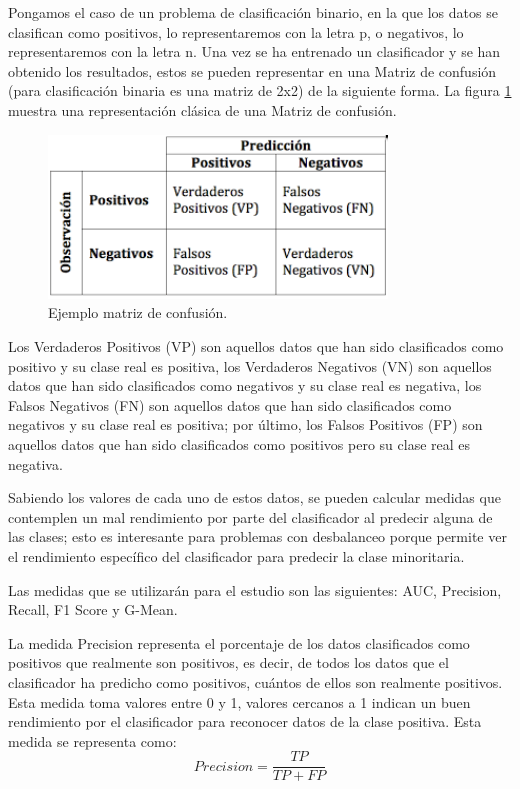 Pongamos el caso de un problema de clasificación binario, en la que los datos se clasifican como positivos, lo representaremos con la letra p, o negativos, lo representaremos con la letra n. Una vez se ha entrenado un clasificador y se han obtenido los resultados, estos se pueden representar en una Matriz de confusión (para clasificación binaria es una matriz de 2x2) de la siguiente forma. La figura \ref{fig:61} muestra una representación clásica de una Matriz de confusión.\newline

\begin{figure}[H]
	\centering
	\includegraphics[width=90mm]{imagenes/conf-matrix.png}
	\caption{Ejemplo matriz de confusión.}
	\label{fig:61}
\end{figure}

Los Verdaderos Positivos (VP) son aquellos datos que han sido clasificados como positivo y su clase real es positiva, los Verdaderos Negativos (VN) son aquellos datos que han sido clasificados como negativos y su clase real es negativa, los Falsos Negativos (FN) son aquellos datos que han sido clasificados como negativos y su clase real es positiva; por último, los Falsos Positivos (FP) son aquellos datos que han sido clasificados como positivos pero su clase real es negativa.\newline

Sabiendo los valores de cada uno de estos datos, se pueden calcular medidas que contemplen un mal rendimiento por parte del clasificador al predecir alguna de las clases; esto es interesante para problemas con desbalanceo porque permite ver el rendimiento específico del clasificador para predecir la clase minoritaria.\newline

Las medidas que se utilizarán para el estudio son las siguientes: AUC, Precision, Recall, F1 Score y G-Mean.\newline

La medida Precision representa el porcentaje de los datos clasificados como positivos que realmente son positivos, es decir, de todos los datos que el clasificador ha predicho como positivos, cuántos de ellos son realmente positivos. Esta medida toma valores entre 0 y 1, valores cercanos a 1 indican un buen rendimiento por el clasificador para reconocer datos de la clase positiva. Esta medida se representa como:\newline
$$ Precision = \frac{TP}{TP + FP} $$

